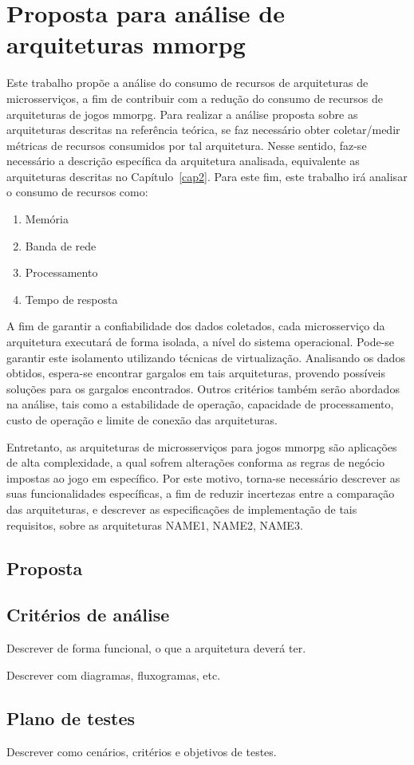 \chapter{Proposta para análise de arquiteturas \ac{mmorpg}}
\label{cap3}

Este trabalho propõe a análise do consumo de recursos de arquiteturas de microsserviços, a fim de contribuir com a redução do consumo de recursos de arquiteturas de jogos \ac{mmorpg}.
%
Para realizar a análise proposta sobre as arquiteturas descritas na referência teórica, se faz necessário obter coletar/medir métricas de recursos consumidos por tal arquitetura.
%
Nesse sentido, faz-se necessário a descrição específica da arquitetura analisada, equivalente as arquiteturas descritas no Capítulo~\ref{cap2}. 
%
Para este fim, este trabalho irá analisar o consumo de recursos como:

\begin{enumerate}
  \item{Memória}
  \item{Banda de rede}
  \item{Processamento}
  \item{Tempo de resposta}
\end{enumerate}

A fim de garantir a confiabilidade dos dados coletados, cada microsserviço da arquitetura executará de forma isolada, a nível do sistema operacional.
%
Pode-se garantir este isolamento utilizando técnicas de virtualização.
%
Analisando os dados obtidos, espera-se encontrar gargalos em tais arquiteturas, provendo possíveis soluções para os gargalos encontrados.
%
Outros critérios também serão abordados na análise, tais como a estabilidade de operação, capacidade de processamento, custo de operação e limite de conexão das arquiteturas.
%

Entretanto, as arquiteturas de microsserviços para jogos \ac{mmorpg} são aplicações de alta complexidade, a qual sofrem alterações conforma as regras de negócio impostas ao jogo em específico.
%
Por este motivo, torna-se necessário descrever as suas funcionalidades específicas, a fim de reduzir incertezas entre a comparação das arquiteturas, e descrever as especificações de implementação de tais requisitos, sobre as arquiteturas NAME1, NAME2, NAME3.


\section{Proposta}



\section{Critérios de análise}

Descrever de forma funcional, o que a arquitetura deverá ter.

Descrever com diagramas, fluxogramas, etc.

\section{Plano de testes}

Descrever como cenários, critérios e objetivos de testes.